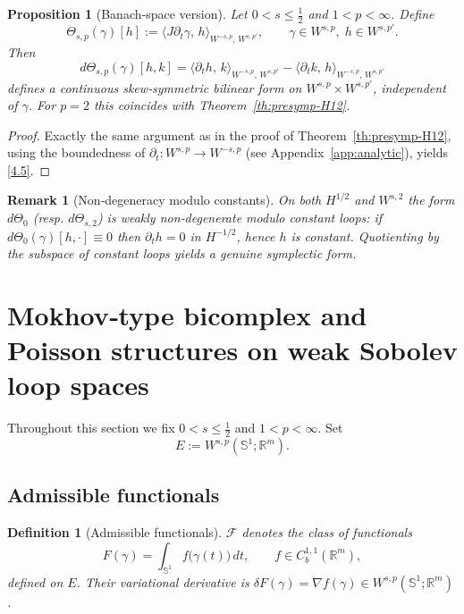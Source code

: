 \documentclass{amsart}
\newcounter{thm}
\newcounter{ex}
\newcounter{re}
\newtheorem{proposition}[thm]{Proposition}
\newtheorem{remark}[thm]{Remark}
\newtheorem{definition}[thm]{Definition}
\begin{document}
\begin{proposition}[Banach‑space version]\label{cor:presymp-Wsp}
Let \(0<s\le\tfrac12\) and \(1<p<\infty\).  Define
\begin{equation}
\Theta_{s,p}(\gamma)[h]
   :=\big\langle J\partial_{t}\gamma,\,h\big\rangle_{W^{-s,p},\,W^{s,p'}},
   \qquad
\gamma\in W^{s,p},\;h\in W^{s,p'} .
\label{4.4}
\end{equation}
Then
\begin{equation}
d\Theta_{s,p}(\gamma)[h,k]
   =\big\langle\partial_{t}h,\,k\big\rangle_{W^{-s,p},\,W^{s,p'}}
    -\big\langle\partial_{t}k,\,h\big\rangle_{W^{-s,p},\,W^{s,p'}}
\label{4.5}
\end{equation}
defines a continuous skew‑symmetric bilinear form on
\(W^{s,p}\times W^{s,p'}\), independent of \(\gamma\).
For \(p=2\) this coincides with Theorem~\ref{th:presymp-H12}.
\end{proposition}
\begin{proof}
Exactly the same argument as in the proof of Theorem~\ref{th:presymp-H12},
using the boundedness of \(\partial_{t}:W^{s,p}\to W^{-s,p}\) (see Appendix~\ref{app:analytic}),
yields \eqref{4.5}.
\end{proof}

\begin{remark}[Non‑degeneracy modulo constants]
On both \(H^{1/2}\) and \(W^{s,2}\) the form \(d\Theta_{0}\) (resp. \(d\Theta_{s,2}\))
is weakly non‑degenerate modulo constant loops: if
\(d\Theta_{0}(\gamma)[h,\cdot]\equiv0\) then \(\partial_{t}h=0\) in \(H^{-1/2}\), hence \(h\) is constant.
Quotienting by the subspace of constant loops yields a genuine symplectic form.
\end{remark}
\section{Mokhov‑type bicomplex and Poisson structures on weak Sobolev loop spaces}
\label{sec:Mokhov}

Throughout this section we fix \(0<s\le\tfrac12\) and \(1<p<\infty\).
Set
\[
E:=W^{s,p}(\mathbb S^{1};\mathbb R^{m}).
\]

\subsection{Admissible functionals}
\begin{definition}[Admissible functionals]\label{def:admissible}
\(\mathcal F\) denotes the class of functionals
\[
F(\gamma)=\int_{\mathbb S^{1}}f\bigl(\gamma(t)\bigr)\,dt,
\qquad
f\in C^{1,1}_{b}(\mathbb R^{m}),
\]
defined on \(E\).  Their variational derivative is
\(\delta F(\gamma)=\nabla f(\gamma)\in W^{s,p}(\mathbb S^{1};\mathbb R^{m})\).
\end{definition}
\end{document}
